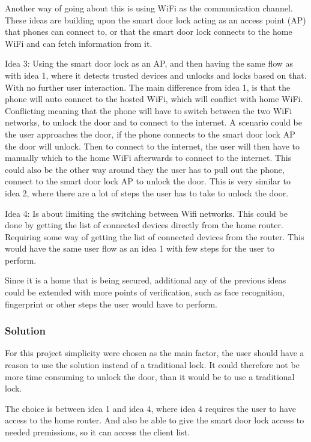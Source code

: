 Another way of going about this is using WiFi as the communication channel.
These ideas are building upon the smart door lock acting as an access point (AP) that phones can connect to, or that the smart door lock connects to the home WiFi and can fetch information from it.

Idea 3: Using the smart door lock as an AP, and then having the same flow as with idea 1, where it detects trusted devices and unlocks and locks based on that. With no further user interaction.
The main difference from idea 1, is that the phone will auto connect to the hosted WiFi, which will conflict with home WiFi.
Conflicting meaning that the phone will have to switch between the two WiFi networks, to unlock the door and to connect to the internet.
A scenario could be the user approaches the door, if the phone connects to the smart door lock AP the door will unlock.
Then to connect to the internet, the user will then have to manually which to the home WiFi afterwards to connect to the internet.
This could also be the other way around they the user has to pull out the phone, connect to the smart door lock AP to unlock the door.
This is very similar to idea 2, where there are a lot of steps the user has to take to unlock the door.

Idea 4: Is about limiting the switching between Wifi networks.
This could be done by getting the list of connected devices directly from the home router.
Requiring some way of getting the list of connected devices from the router.
This would have the same user flow as an idea 1 with few steps for the user to perform.

Since it is a home that is being secured, additional any of the previous ideas could be extended with more points of verification, such as face recognition, fingerprint or other steps the user would have to perform.

\subsubsection{Solution}
For this project simplicity were chosen as the main factor, the user should have a reason to use the solution instead of a traditional lock.
It could therefore not be more time consuming to unlock the door, than it would be to use a traditional lock.

The choice is between idea 1 and idea 4, where idea 4 requires the user to have access to the home router.
And also be able to give the smart door lock access to needed premissions, so it can access the client list.

